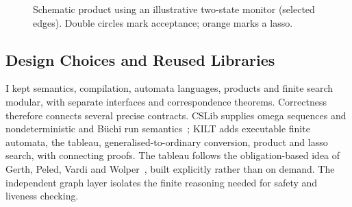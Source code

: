 \begin{figure}[ht]
  \centering
  \resizebox{0.76\linewidth}{!}{}
  \caption{Schematic product using an illustrative two-state monitor (selected
    edges). Double circles mark acceptance; orange marks a lasso.}
  \label{fig:product-lasso-panel}
\end{figure}

\subsection{Design Choices and Reused Libraries}

I kept semantics, compilation, automata languages, products and finite search
modular, with separate interfaces and correspondence theorems. Correctness
therefore connects several precise contracts. CSLib supplies omega sequences
and nondeterministic and B\"uchi run semantics~\cite{CSLib}; KILT adds executable
finite automata, the tableau, generalised-to-ordinary conversion, product and
lasso search, with connecting proofs. The tableau follows the obligation-based
idea of Gerth, Peled, Vardi and Wolper~\cite{GerthPeledVardiWolper1995}, built
explicitly rather than on demand. The independent graph layer isolates the
finite reasoning needed for safety and liveness checking.
